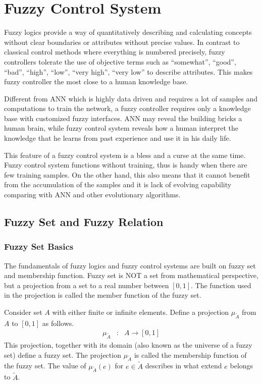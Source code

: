 \chapter{Fuzzy Control System} \label{ch:fcs}

Fuzzy logics provide a way of quantitatively describing and calculating concepts without clear boundaries or attributes without precise values. In contrast to classical control methods where everything is numbered precisely, fuzzy controllers tolerate the use of objective terms such as ``somewhat'', ``good'', ``bad'', ``high'', ``low'', ``very high'', ``very low'' to describe attributes. This makes fuzzy controller the most close to a human knowledge base.

Different from ANN which is highly data driven and requires a lot of samples and computations to train the network, a fuzzy controller requires only a knowledge base with customized fuzzy interfaces. ANN may reveal the building bricks a human brain, while fuzzy control system reveals how a human interpret the knowledge that he learns from past experience and use it in his daily life. 

This feature of a fuzzy control system is a bless and a curse at the same time. Fuzzy control system functions without training, thus is handy when there are few training samples. On the other hand, this also means that it cannot benefit from the accumulation of the samples and it is lack of evolving capability comparing with ANN and other evolutionary algorithms.

\section{Fuzzy Set and Fuzzy Relation}

\subsection{Fuzzy Set Basics}

The fundamentals of fuzzy logics and fuzzy control systems are built on fuzzy set and membership function. Fuzzy set is NOT a set from mathematical perspective, but a projection from a set to a real number between $[0, 1]$. The function used in the projection is called the member function of the fuzzy set.

Consider set $A$ with either finite or infinite elements. Define a projection $\mu_{\tilde{A}}$ from $A$ to $[0, 1]$ as follows. 
\begin{eqnarray}
	\mu_{\tilde{A}} &:& A \rightarrow [0, 1] \nonumber
\end{eqnarray}
This projection, together with its domain (also known as the universe of a fuzzy set) define a fuzzy set. The projection $\mu_{\tilde{A}}$ is called the membership function of the fuzzy set. The value of $\mu_{\tilde{A}}(e)$ for $e\in \tilde{A}$ describes in what extend $e$ belongs to $\tilde{A}$.

